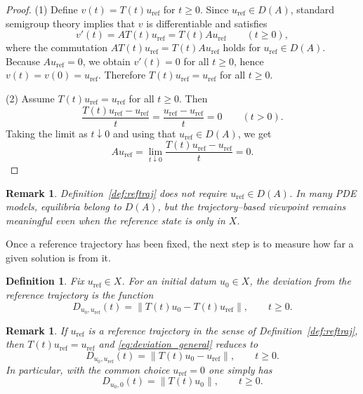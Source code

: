 \documentclass[12pt]{article}
\newtheorem{definition}[theorem]{Definition}
\newtheorem{remark}[theorem]{Remark}
\begin{document}
\begin{proof}
(1) Define $v(t)=T(t)u_{\mathrm{ref}}$ for $t\ge 0$. Since $u_{\mathrm{ref}}\in D(A)$, standard semigroup theory implies that $v$ is differentiable and satisfies
\[
v'(t)=AT(t)u_{\mathrm{ref}}=T(t)Au_{\mathrm{ref}}\qquad (t\ge 0),
\]
where the commutation $AT(t)u_{\mathrm{ref}}=T(t)Au_{\mathrm{ref}}$ holds for $u_{\mathrm{ref}}\in D(A)$. Because $Au_{\mathrm{ref}}=0$, we obtain $v'(t)=0$ for all $t\ge 0$, hence $v(t)=v(0)=u_{\mathrm{ref}}$. Therefore $T(t)u_{\mathrm{ref}}=u_{\mathrm{ref}}$ for all $t\ge 0$.

(2) Assume $T(t)u_{\mathrm{ref}}=u_{\mathrm{ref}}$ for all $t\ge 0$. Then
\[
\frac{T(t)u_{\mathrm{ref}}-u_{\mathrm{ref}}}{t}=\frac{u_{\mathrm{ref}}-u_{\mathrm{ref}}}{t}=0
\qquad (t>0).
\]
Taking the limit as $t\downarrow 0$ and using that $u_{\mathrm{ref}}\in D(A)$, we get
\[
Au_{\mathrm{ref}}
=\lim_{t\downarrow 0}\frac{T(t)u_{\mathrm{ref}}-u_{\mathrm{ref}}}{t}
=0.
\]
\end{proof}

\begin{remark}\label{rem:fixedpoint_not_in_DA}
Definition~\ref{def:reftraj} does not require $u_{\mathrm{ref}}\in D(A)$. In many PDE models, equilibria belong to $D(A)$, but the trajectory--based viewpoint remains meaningful even when the reference state is only in $X$.
\end{remark}


Once a reference trajectory has been fixed, the next step is to measure how far a given solution is from it.

\begin{definition}\label{def:deviation}
Fix $u_{\mathrm{ref}}\in X$. For an initial datum $u_0\in X$, the \emph{deviation} from the reference trajectory is the function
\begin{equation}\label{eq:deviation_general}
D_{u_0,u_{\mathrm{ref}}}(t)
=\|T(t)u_0-T(t)u_{\mathrm{ref}}\|,\qquad t\ge 0.
\end{equation}
\end{definition}

\begin{remark}\label{rem:deviation_equilibrium}
If $u_{\mathrm{ref}}$ is a reference trajectory in the sense of Definition~\ref{def:reftraj}, then $T(t)u_{\mathrm{ref}}=u_{\mathrm{ref}}$ and \eqref{eq:deviation_general} reduces to
\[
D_{u_0,u_{\mathrm{ref}}}(t)=\|T(t)u_0-u_{\mathrm{ref}}\|,\qquad t\ge 0.
\]
In particular, with the common choice $u_{\mathrm{ref}}=0$ one simply has
\[
D_{u_0,0}(t)=\|T(t)u_0\|,\qquad t\ge 0.
\]
\end{remark}
\end{document}
